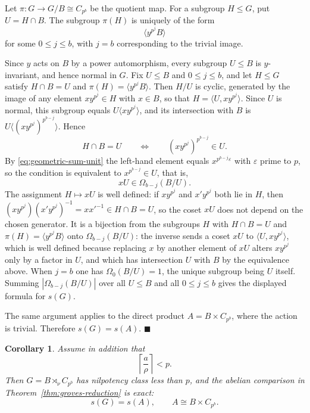 \documentclass[a4paper,11pt,reqno]{amsart}
\theoremstyle{plain}
\newtheorem{corollary}[theorem]{Corollary}
\theoremstyle{remark}
\numberwithin{equation}{section}
\newcommand{\card}[1]{\left\lvert #1\right\rvert}
\renewcommand{\leq}{\leqslant}
\newenvironment{proofof}{{\bf Proof. }}{\hfill $\blacksquare$ \\}
\begin{document}
\begin{proofof}
Let $\pi:G\to G/B\cong C_{p^b}$ be the quotient map. For a subgroup
$H\leq G$, put $U=H\cap B$. The subgroup $\pi(H)$ is uniquely of the form
\[
        \langle y^{p^j}B\rangle
\]
for some $0\leq j\leq b$, with $j=b$ corresponding to the trivial image.

Since $y$ acts on $B$ by a power automorphism, every subgroup $U\leq B$ is
$y$-invariant, and hence normal in $G$. Fix $U\leq B$ and $0\leq j\leq b$, and
let $H\leq G$ satisfy $H\cap B=U$ and $\pi(H)=\langle y^{p^j}B\rangle$. Then
$H/U$ is cyclic, generated by the image of any element $xy^{p^j}\in H$ with
$x\in B$, so that $H=\langle U,xy^{p^j}\rangle$. Since $U$ is normal, this
subgroup equals $U\langle xy^{p^j}\rangle$, and its intersection with $B$ is
$U\langle (xy^{p^j})^{p^{b-j}}\rangle$. Hence
\[
        H\cap B=U
        \qquad\Longleftrightarrow\qquad
        (xy^{p^j})^{p^{b-j}}\in U.
\]
By \eqref{eq:geometric-sum-unit} the left-hand element equals
$x^{p^{b-j}\varepsilon}$ with $\varepsilon$ prime to $p$, so the condition is
equivalent to $x^{p^{b-j}}\in U$, that is,
\[
        xU\in \Omega_{b-j}(B/U).
\]
The assignment $H\mapsto xU$ is well defined: if $xy^{p^j}$ and $x'y^{p^j}$
both lie in $H$, then $(xy^{p^j})(x'y^{p^j})^{-1}=xx'^{-1}\in H\cap B=U$, so
the coset $xU$ does not depend on the chosen generator. It is a bijection from
the subgroups $H$ with $H\cap B=U$ and $\pi(H)=\langle y^{p^j}B\rangle$ onto
$\Omega_{b-j}(B/U)$: the inverse sends a coset $xU$ to
$\langle U,xy^{p^j}\rangle$, which is well defined because replacing $x$ by
another element of $xU$ alters $xy^{p^j}$ only by a factor in $U$, and which
has intersection $U$ with $B$ by the equivalence above. When $j=b$ one has
$\Omega_0(B/U)=1$, the unique subgroup being $U$ itself. Summing
$\card{\Omega_{b-j}(B/U)}$ over all $U\leq B$ and all $0\leq j\leq b$ gives the
displayed formula for $s(G)$.

The same argument applies to the direct product $A=B\times C_{p^b}$, where the
action is trivial. Therefore $s(G)=s(A)$.
\end{proofof}

\begin{corollary}\label{cor:power-action-sharpness}
Assume in addition that
\[
        \left\lceil\frac{a}{\rho}\right\rceil<p.
\]
Then $G=B\rtimes_\nu C_{p^b}$ has nilpotency class less than $p$, and
the abelian comparison in Theorem~\ref{thm:groves-reduction} is exact:
\[
        s(G)=s(A),
        \qquad
        A\cong B\times C_{p^b}.
\]
\end{corollary}
\end{document}

